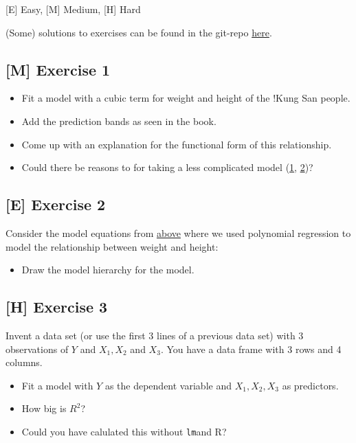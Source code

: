 \documentclass[
]{book}
\providecommand{\tightlist}{%
  \setlength{\itemsep}{0pt}\setlength{\parskip}{0pt}}
\begin{document}
{[}E{]} Easy, {[}M{]} Medium, {[}H{]} Hard

(Some) solutions to exercises can be found in the git-repo \href{https://github.com/jdegenfellner/Script_QM2_ZHAW/tree/main/Solutions_Exercises}{here}.

\subsection{{[}M{]} Exercise 1}\label{exercise1_multiple_regression}

\begin{itemize}
\tightlist
\item
  Fit a model with a cubic term for weight and height of the !Kung San people.
\item
  Add the prediction bands as seen in the book.
\item
  Come up with an explanation for the functional form of this relationship.
\item
  Could there be reasons to for taking a less complicated model
  (\href{https://en.wikipedia.org/wiki/Statistical_model_specification}{1}, \href{https://en.wikipedia.org/wiki/Occam\%27s_razor}{2})?
\end{itemize}

\subsection{{[}E{]} Exercise 2}\label{exercise2_multiple_regression}

Consider the model equations from \hyperref[adding_transformed_predictor]{above}
where we used polynomial regression to model the relationship between
weight and height:

\begin{itemize}
\tightlist
\item
  Draw the model hierarchy for the model.
\end{itemize}

\subsection{{[}H{]} Exercise 3}\label{exercise3_multiple_regression}

Invent a data set (or use the first 3 lines of a previous data set)
with 3 observations of \(Y\) and \(X_1, X_2\) and \(X_3\). You have a data frame
with 3 rows and 4 columns.

\begin{itemize}
\tightlist
\item
  Fit a model with \(Y\) as the dependent variable and \(X_1, X_2, X_3\) as predictors.
\item
  How big is \(R^2\)?
\item
  Could you have calulated this without \texttt{lm}and R?
\end{itemize}
\end{document}

